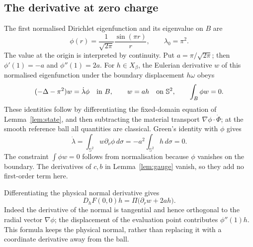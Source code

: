 \documentclass[11pt,a4paper]{article}
\theoremstyle{definition}
\theoremstyle{remark}
\begin{document}
\subsection{The derivative at zero charge}
The first normalised Dirichlet eigenfunction and its eigenvalue on $B$ are
\[
 \phi(r)=\frac{1}{\sqrt{2\pi}}\frac{\sin(\pi r)}{r},
 \qquad \lambda_0=\pi^2.
\]
The value at the origin is interpreted by continuity. Put $a=\pi/\sqrt{2\pi}$; then $\phi'(1)=-a$ and $\phi''(1)=2a$. For $h\in X_\beta$, the Eulerian derivative $w$ of this normalised eigenfunction under the boundary displacement $h\omega$ obeys
\begin{equation}\label{eq:eulerian}
 (-\Delta-\pi^2)w=\dot\lambda\phi\quad\hbox{in }B,
 \qquad w=ah\quad\hbox{on }\mathbb S^2,
 \qquad \int_B\phi w=0.
\end{equation}
These identities follow by differentiating the fixed-domain equation of Lemma~\ref{lem:state}, and then subtracting the material transport $\nabla\phi\cdot\dot\Phi$; at the smooth reference ball all quantities are classical. Green's identity with $\phi$ gives
\[
 \dot\lambda=\int_{\mathbb S^2}w\partial_\nu\phi\,d\sigma
             =-a^2\int_{\mathbb S^2}h\,d\sigma=0.
\]
The constraint $\int\phi w=0$ follows from normalisation because $\phi$ vanishes on the boundary. The derivatives of $c,b$ in Lemma~\ref{lem:gauge} vanish, so they add no first-order term here.

Differentiating the physical normal derivative gives
\begin{equation}\label{eq:flux-linearisation}
 D_hF(0,0)h=\Pi\bigl(\partial_r w+2ah\bigr).
\end{equation}
Indeed the derivative of the normal is tangential and hence orthogonal to the radial vector $\nabla\phi$; the displacement of the evaluation point contributes $\phi''(1)h$. This formula keeps the physical normal, rather than replacing it with a coordinate derivative away from the ball.
\end{document}
